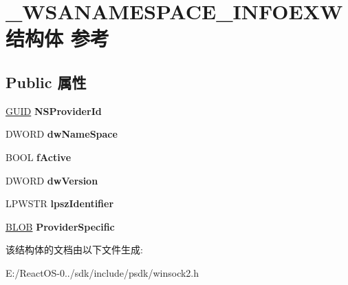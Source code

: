 \hypertarget{struct___w_s_a_n_a_m_e_s_p_a_c_e___i_n_f_o_e_x_w}{}\section{\+\_\+\+W\+S\+A\+N\+A\+M\+E\+S\+P\+A\+C\+E\+\_\+\+I\+N\+F\+O\+E\+X\+W结构体 参考}
\label{struct___w_s_a_n_a_m_e_s_p_a_c_e___i_n_f_o_e_x_w}
\subsection*{Public 属性}
\begin{DoxyCompactItemize}
\item 
\mbox{\label{struct___w_s_a_n_a_m_e_s_p_a_c_e___i_n_f_o_e_x_w_af33847d113a6ad57dcc6e109d782b160}} 
\hyperlink{interface_g_u_i_d}{G\+U\+ID} {\bfseries N\+S\+Provider\+Id}
\item 
\mbox{\label{struct___w_s_a_n_a_m_e_s_p_a_c_e___i_n_f_o_e_x_w_a5cd29ae0abbcf43d45d40e5c5f65f00c}} 
D\+W\+O\+RD {\bfseries dw\+Name\+Space}
\item 
\mbox{\label{struct___w_s_a_n_a_m_e_s_p_a_c_e___i_n_f_o_e_x_w_a8ef5b4548e2a5ce00765b2dd558293fb}} 
B\+O\+OL {\bfseries f\+Active}
\item 
\mbox{\label{struct___w_s_a_n_a_m_e_s_p_a_c_e___i_n_f_o_e_x_w_acb16d64beb00ea66c1f8a81a69df87be}} 
D\+W\+O\+RD {\bfseries dw\+Version}
\item 
\mbox{\label{struct___w_s_a_n_a_m_e_s_p_a_c_e___i_n_f_o_e_x_w_a7ce74135384d69bad8b53486dbcab3dd}} 
L\+P\+W\+S\+TR {\bfseries lpsz\+Identifier}
\item 
\mbox{\label{struct___w_s_a_n_a_m_e_s_p_a_c_e___i_n_f_o_e_x_w_a51d634c4e9abc76deb8bf956e81105fa}} 
\hyperlink{struct___b_l_o_b}{B\+L\+OB} {\bfseries Provider\+Specific}
\end{DoxyCompactItemize}


该结构体的文档由以下文件生成\+:\begin{DoxyCompactItemize}
\item 
E\+:/\+React\+O\+S-\/0../sdk/include/psdk/winsock2.\+h\end{DoxyCompactItemize}

